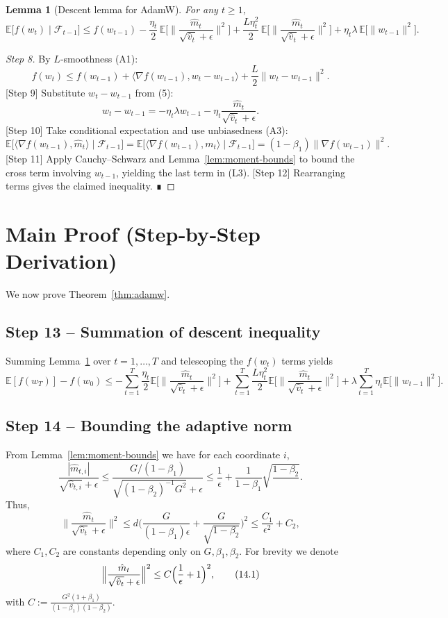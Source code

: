 \documentclass{article}
\newtheorem{lemma}{Lemma}
\newcommand{\EE}{\mathbb{E}}
\begin{document}
\begin{lemma}[Descent lemma for AdamW]\label{lem:descent}
For any $t\ge1$,
\[
\EE\!\big[f(w_t)\mid\mathcal{F}_{t-1}\big]
\le f(w_{t-1})
-\frac{\eta_t}{2}\,\EE\!\Big[\Big\|\frac{\hat m_t}{\sqrt{\hat v_t}+\epsilon}\Big\|^2\Big]
+\frac{L\eta_t^2}{2}\,\EE\!\Big[\Big\|\frac{\hat m_t}{\sqrt{\hat v_t}+\epsilon}\Big\|^2\Big]
+ \eta_t\lambda\,\EE\!\big[\|w_{t-1}\|^2\big].
\tag{L3}
\]
\end{lemma}
\begin{proof}
[Step 8] By $L$‑smoothness (A1):
\[
f(w_t)\le f(w_{t-1})+\langle\nabla f(w_{t-1}),w_t-w_{t-1}\rangle+\frac{L}{2}\|w_t-w_{t-1}\|^2.
\]
[Step 9] Substitute $w_t-w_{t-1}$ from (5):
\[
w_t-w_{t-1}= -\eta_t\lambda w_{t-1} -\eta_t\frac{\hat m_t}{\sqrt{\hat v_t}+\epsilon}.
\]
[Step 10] Take conditional expectation and use unbiasedness (A3):
\[
\EE\!\big[\langle\nabla f(w_{t-1}),\hat m_t\rangle\mid\mathcal{F}_{t-1}\big]
= \EE\!\big[\langle\nabla f(w_{t-1}), m_t\rangle\mid\mathcal{F}_{t-1}\big]
= (1-\beta_1)\|\nabla f(w_{t-1})\|^2.
\]
[Step 11] Apply Cauchy–Schwarz and Lemma~\ref{lem:moment-bounds} to bound the cross term involving $w_{t-1}$, yielding the last term in (L3).  
[Step 12] Rearranging terms gives the claimed inequality. ∎
\end{proof}

\section*{Main Proof (Step‑by‑Step Derivation)}
We now prove Theorem~\ref{thm:adamw}.

\subsection*{Step 13 – Summation of descent inequality}
Summing Lemma~\ref{lem:descent} over $t=1,\dots,T$ and telescoping the $f(w_t)$ terms yields
\[
\EE[f(w_T)]-f(w_0)
\le -\sum_{t=1}^{T}\frac{\eta_t}{2}\EE\!\Big[\Big\|\frac{\hat m_t}{\sqrt{\hat v_t}+\epsilon}\Big\|^2\Big]
+\sum_{t=1}^{T}\frac{L\eta_t^2}{2}\EE\!\Big[\Big\|\frac{\hat m_t}{\sqrt{\hat v_t}+\epsilon}\Big\|^2\Big]
+\lambda\sum_{t=1}^{T}\eta_t\EE\!\big[\|w_{t-1}\|^2\big].
\tag{13.1}
\]

\subsection*{Step 14 – Bounding the adaptive norm}
From Lemma~\ref{lem:moment-bounds} we have for each coordinate $i$,
\[
\frac{|\hat m_{t,i}|}{\sqrt{\hat v_{t,i}}+\epsilon}
\le
\frac{G/(1-\beta_1)}{\sqrt{(1-\beta_2)^{-1}G^2}+\epsilon}
\le
\frac{1}{\epsilon}+\frac{1}{1-\beta_1}\sqrt{\frac{1-\beta_2}{}} .
\]
Thus,
\[
\Big\|\frac{\hat m_t}{\sqrt{\hat v_t}+\epsilon}\Big\|^2
\le d\Big(\frac{G}{(1-\beta_1)\epsilon}+ \frac{G}{\sqrt{1-\beta_2}}\Big)^2
\le \frac{C_1}{\epsilon^2}+C_2,
\]
where $C_1,C_2$ are constants depending only on $G,\beta_1,\beta_2$. For brevity we denote
\[
\Big\|\frac{\hat m_t}{\sqrt{\hat v_t}+\epsilon}\Big\|^2\le C\Bigl(\frac{1}{\epsilon}+1\Bigr)^2,
\tag{14.1}
\]
with $C:=\frac{G^2(1+\beta_1)}{(1-\beta_1)(1-\beta_2)}$.
\end{document}
